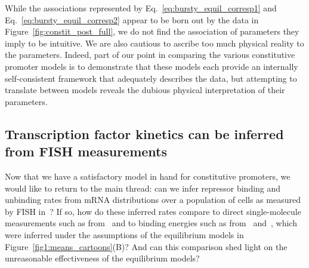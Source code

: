 While the associations represented by
Eq.~\ref{eq:bursty_equil_corresp1} and Eq.~\ref{eq:bursty_equil_corresp2}
appear to be born out by the data in Figure~\ref{fig:constit_post_full},
we do not find the association of parameters they imply to be intuitive.
We are also cautious to ascribe too much physical reality to the parameters.
Indeed, part of our point in comparing the various constitutive
promoter models is to demonstrate that these models each provide
an internally self-consistent framework that adequately describes
the data, but attempting to translate between models reveals
the dubious physical interpretation of their parameters.


\subsection{Transcription factor kinetics can be inferred from FISH measurements}
\label{sec:rep_kinetics_inference}

Now that we have a satisfactory model in hand for constitutive
promoters, we would like to return to the main thread: can we
infer repressor binding and unbinding rates from mRNA distributions
over a population of cells as measured by FISH in~\cite{Jones2014}?
If so, how do these inferred rates compare to direct
single-molecule measurements such as from~\cite{Hammar2014} and
to binding energies such as from~\cite{Garcia2011a}
and~\cite{Razo-Mejia2018}, which were inferred under the assumptions
of the equilibrium models in Figure~\ref{fig1:means_cartoons}(B)?
And can this comparison shed light on the unreasonable effectiveness
of the equilibrium models?

